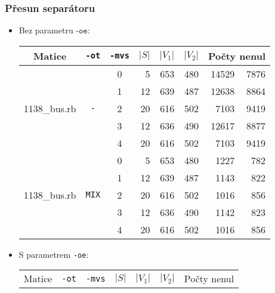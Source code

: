 \documentclass{beamer}
\begin{document}
\begin{frame}
    \frametitle{Přesun separátoru}
    \begin{itemize}
      \item Bez parametru $\texttt{-oe}$:
      \begin{table}[ht]
        \tiny
        \centering
        \renewcommand{\arraystretch}{1.15}
        \begin{tabular}{|l|c|c|r|r|r|r|r|}
          \hline
          \multicolumn{1}{|c|}{Matice} & \multicolumn{1}{|c|}{\texttt{-ot}}  &\multicolumn{1}{|c|}{\texttt{-mvs}} &\multicolumn{1}{|c|}{$|S|$} & \multicolumn{1}{|c|}{$|V_1|$}& \multicolumn{1}{|c|}{$|V_2|$} & \multicolumn{2}{c|}{Počty nenul} \\
          \hline
          \multirow{5}{*}{1138\_bus.rb}
          & \multirow{5}{*}{\texttt{-}} & 0 
          &	5	&	653	&	480	& 14529	&	7876 \\
          & & 1 
          &	12	&	639	&	487	&	12638	&	8864	\\
          & & 2
          &	20	&	616	&	502	&	7103	&	9419	\\
          & & 3
          &	12	&	636	&	490	&	12617	&	8877	\\
          & & 4
          &	20	&	616	&	502	&	7103	&	9419	\\
          \hline
          \multirow{5}{*}{1138\_bus.rb}
          & \multirow{5}{*}{\texttt{MIX}} & 0 
          &	5	&	653	&	480	& 1227	&	782 \\
          & & 1 
          &	12	&	639	&	487	&	1143	&	822	\\
          & & 2
          &	20	&	616	&	502	&	1016	&	856	\\
          & & 3
          &	12	&	636	&	490	&	1142	&	823	\\
          & & 4
          &	20	&	616	&	502	&	1016	&	856	\\
        \hline
        \end{tabular}
      \end{table}
    \item S parametrem \texttt{-oe}:
    \begin{table}[ht]
      \tiny
      \centering
      \renewcommand{\arraystretch}{1.15}
      \begin{tabular}{|l|c|c|r|r|r|r|r|}
        \hline
        \multicolumn{1}{|c|}{Matice} & \multicolumn{1}{|c|}{\texttt{-ot}}  &\multicolumn{1}{|c|}{\texttt{-mvs}} &\multicolumn{1}{|c|}{$|S|$} & \multicolumn{1}{|c|}{$|V_1|$}& \multicolumn{1}{|c|}{$|V_2|$} & \multicolumn{2}{c|}{Počty nenul} \\

\end{tabular}
\end{table}
\end{itemize}
\end{frame}
\end{document}
